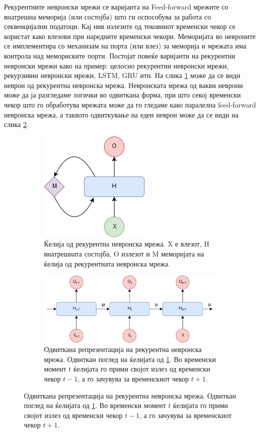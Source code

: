 Рекурентните невронски мрежи се варијанта на Feed-forward мрежите со внатрешна меморија (или состојба) што ги оспособува за работа со секвенцијални податоци. Кај нив излезите од тековниот временски чекор се користат како влезови при наредните временски чекори. Меморијата во невроните се имплементира со механизам на порта (или влез) за меморија и мрежата има контрола над мемориските порти. Постојат повеќе варијанти на рекурентни невронски мрежи како на пример: целосно рекурентни невронски мрежи, рекурзивни невронски мрежи, LSTM, GRU итн. На слика \ref{fig:rnn_folded} може да се види неврон од рекурентна невронска мрежа. Невронската мрежа од вакви неврони може да ја разгледаме логички во одвиткана форма, при што секој временски чекор што го обработува мрежата може да го гледаме како паралелна feed-forward невронска мрежа, а таквото одвиткување на еден неврон може да се види на слика \ref{fig:rnn_unfolded}.

\begin{figure}[H]
	\centering
	\caption{Рекурентна невронска мрежа.}
    \begin{subfigure}[t]{1\linewidth} 
        \centering\includegraphics[width=.3\linewidth]{images/rnn_folded.png}
        \caption{Ќелија од рекурентна невронска мрежа. X е влезот, H внатрешната состојба, O излезот и M меморијата на ќелија од рекурентната невронска мрежа.}	
        \label{fig:rnn_folded}
    \end{subfigure}
    \begin{subfigure}[t]{1\linewidth}       
        \centering\includegraphics[width=.7\linewidth]{images/rnn_unfolded.png}
        \caption{Одвиткана репрезентација на рекурентна невронска мрежа. Одвиткан поглед на ќелијата од \ref{fig:rnn_folded}. Во временски момент $t$ ќелијата го прими својот излез од временски чекор $t-1$, а го зачувува за временскиот чекор $t+1$.}
        \label{fig:rnn_unfolded}
    \end{subfigure}
	\label{fig:rnn}
\end{figure}

